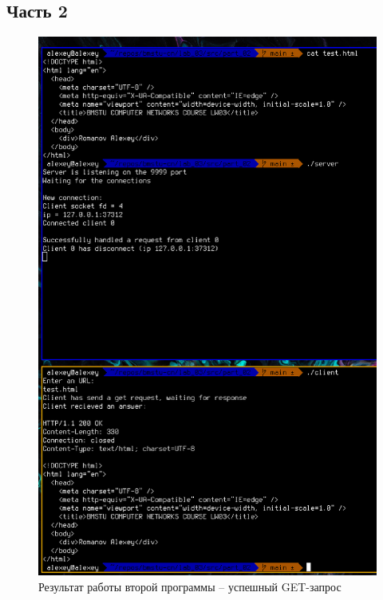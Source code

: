 \documentclass[12pt]{report}
\begin{document}
\subsection*{Часть 2}

\begin{figure}[H]
	\begin{center}
		\includegraphics[scale=0.55]{img/prog_02_01.png}
	\end{center}
	\caption{Результат работы второй программы -- успешный GET-запрос}
	\label{fig:prog_02_01}
\end{figure}
\end{document}
